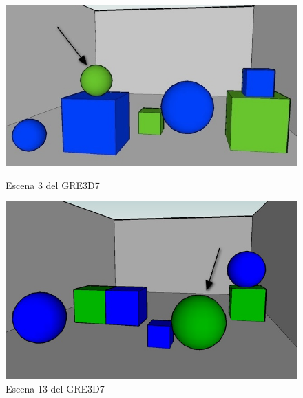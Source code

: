 \begin{figure}[ht]
\begin{minipage}[b]{0.5\linewidth}
\centering
\includegraphics[width=\textwidth]{images/3.jpg}
\caption{Escena 3 del GRE3D7}
\label{GRE3D7-stimulus-3}
\end{minipage}
\begin{minipage}[b]{0.5\linewidth}
\centering
\includegraphics[width=\textwidth]{images/13.jpg}
\caption{Escena 13 del GRE3D7}
\label{GRE3D7-stimulus-13}
\end{minipage}
\end{figure}

